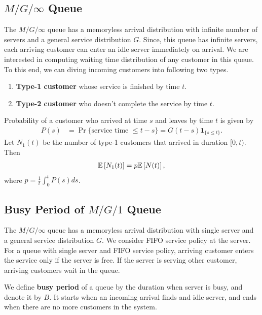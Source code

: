 \documentclass[a4paper,english,10pt]{article}
\begin{document}
\subsection{$M/G/\infty$ Queue}
The $M/G/\infty$ queue has a memoryless arrival distribution with infinite number of servers and a general service distribution $G$. 
Since, this queue has infinite servers, each arriving customer can enter an idle server immediately on arrival. 
We are interested in computing waiting time distribution of any customer in this queue.
To this end, we can diving incoming customers into following two types.
\begin{enumerate}
	\item \textbf{Type-1 customer} whose service is finished by time $t$.
	\item \textbf{Type-2 customer} who doesn't complete the service by time $t$.
\end{enumerate}
Probability of a customer who arrived at time $s$ and leaves by time $t$ is given by 
\begin{align*}
P(s) &= \Pr\{\text{service time } \leq t  - s \} = G(t-s)\textbf{1}_{\{s\leq t\}}. 
\end{align*}
Let $N_1(t)$ be the number of type-1 customers that arrived in duration $[0,t)$. 
Then
\begin{align*}
\mathbb{E}\left[N_1(t)\right]=p\mathbb{E}\left[N(t)\right],
\end{align*}
where $p=\frac{1}{t}\int_{0}^{t}P(s)ds$.


\subsection{Busy Period of $M/G/1$ Queue}
The $M/G/\infty$ queue has a memoryless arrival distribution with single server and a general service distribution $G$. 
We consider FIFO service policy at the server.
For a queue with single server and FIFO service policy, arriving customer enters the service only if the server is free.
If the server is serving other customer, arriving customers wait in the queue. 
\begin{defn} We define \textbf{busy period} of a queue by the duration when server is busy, and denote it by $B$. It starts when an incoming arrival finds and idle server, and ends when there are no more customers in the system.
\end{defn}
\end{document}
